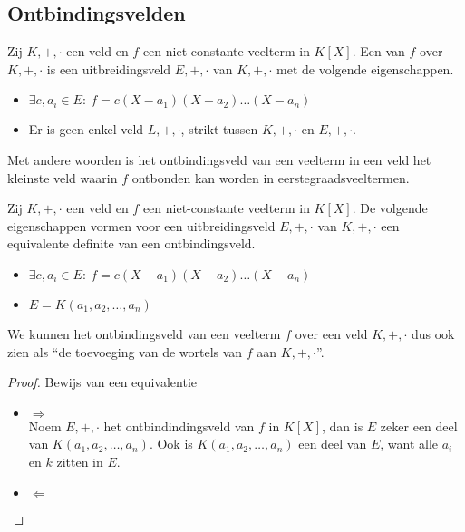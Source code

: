 \documentclass[main.tex]{subfiles}
\begin{document}
\subsection{Ontbindingsvelden}
\label{sec:ontbindingsvelden}

\begin{de}
  Zij $K,+,\cdot$ een veld en $f$ een niet-constante veelterm in $K[X]$.
  Een  van $f$ over $K,+,\cdot$ is een uitbreidingsveld $E,+,\cdot$ van $K,+,\cdot$ met de volgende eigenschappen.
  \begin{itemize}
  \item $\exists c, a_{i} \in E:\ f = c(X-a_{1})(X-a_{2})\dotsc(X-a_{n})$
  \item Er is geen enkel veld $L,+,\cdot$, strikt tussen $K,+,\cdot$ en $E,+,\cdot$.
  \end{itemize}
  Met andere woorden is het ontbindingsveld van een veelterm in een veld het kleinste veld waarin $f$ ontbonden kan worden in eerstegraadsveeltermen.
\end{de}

\begin{st}
  Zij $K,+,\cdot$ een veld en $f$ een niet-constante veelterm in $K[X]$.
  De volgende eigenschappen vormen voor een uitbreidingsveld $E,+,\cdot$ van $K,+,\cdot$ een equivalente definite van een ontbindingsveld.
  \begin{itemize}
  \item $\exists c, a_{i} \in E:\ f = c(X-a_{1})(X-a_{2})\dotsc(X-a_{n})$
  \item $E = K(a_{1},a_{2},\dotsc,a_{n})$
  \end{itemize}
  We kunnen het ontbindingsveld van een veelterm $f$ over een veld $K,+,\cdot$ dus ook zien als ``de toevoeging van de wortels van $f$ aan $K,+,\cdot$''.

  \begin{proof}
    Bewijs van een equivalentie
    \begin{itemize}
    \item $\Rightarrow$\\
      Noem $E,+,\cdot$ het ontbindindingsveld van $f$ in $K[X]$, dan is $E$ zeker een deel van $ K(a_{1},a_{2},\dotsc,a_{n})$.\waarom
      Ook is $K(a_{1},a_{2},\dotsc,a_{n})$ een deel van $E$, want alle $a_{i}$ en $k$ zitten in $E$.
      \waarom
    \item $\Leftarrow$\\
    \end{itemize}
  \end{proof}
\end{st}
\end{document}
